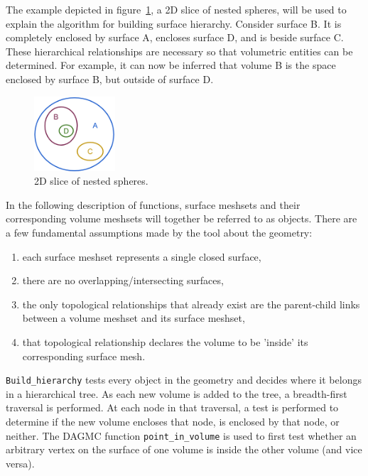 \documentclass{anstrans}
\begin{document}
The example depicted in figure~\ref{fig:spheres}, a 2D slice of nested spheres, will 
be used to explain the algorithm for building surface hierarchy. Consider surface B.
It is completely enclosed by surface A, encloses surface D, and is beside surface C. 
These hierarchical relationships are necessary so that volumetric entities can be
determined.  For example, it can now be inferred that volume B is the space enclosed 
by surface B, but outside of surface D.

\begin{figure}[ht]
 \centering
 \includegraphics[width=0.27\textwidth]{../figs/nested_spheres.png}
 \caption{2D slice of nested spheres.}
 \label{fig:spheres}
\end{figure}

In the following description of functions, surface meshsets and their corresponding volume meshsets will
together be referred to as objects.  
There are a few fundamental assumptions made by the tool about the geometry:
\begin{enumerate}
\item each surface meshset represents a single closed surface,
\item there are no overlapping/intersecting surfaces, 
\item the only topological relationships that already exist are the parent-child links between a volume meshset and its surface meshset, 
\item that topological relationship declares the volume to be 'inside' its corresponding surface mesh.
\end{enumerate}

\texttt{Build\_hierarchy} tests every object in the geometry and decides where
it belongs in a hierarchical tree.  As each new volume is added to the tree, a
breadth-first traversal is performed.  At each node in that traversal, a test
is performed to determine if the new volume encloses that node, is enclosed by
that node, or neither.  The DAGMC function \texttt{point\_in\_volume} is used
to first test whether an arbitrary vertex on the surface of one volume is
inside the other volume (and vice versa).
\end{document}
